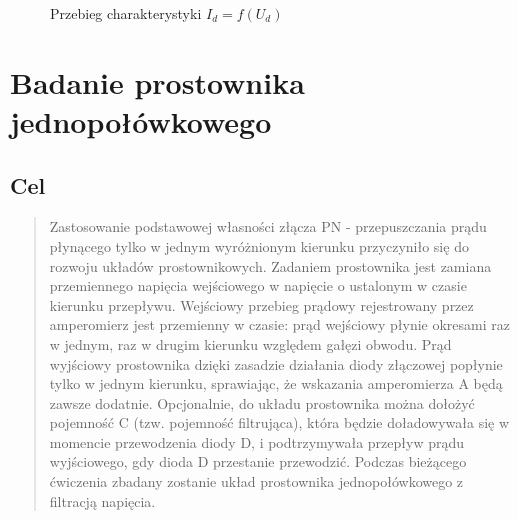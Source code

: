 \documentclass[polish,a4paper]{article}
\begin{document}
\begin{figure}[H]
\centering
{}
\caption{Przebieg charakterystyki $I_{d}=f(U_{d})$}
\end{figure}
\newpage

\section{Badanie prostownika jednopołówkowego}
\subsection{Cel}
\begin{quotation}
Zastosowanie podstawowej własności złącza PN - przepuszczania prądu płynącego tylko w jednym wyróżnionym kierunku przyczyniło się do rozwoju układów prostownikowych. Zadaniem prostownika jest zamiana przemiennego napięcia wejściowego w napięcie o ustalonym w czasie kierunku przepływu. Wejściowy przebieg prądowy rejestrowany przez amperomierz jest przemienny w czasie:  prąd wejściowy płynie okresami raz w jednym, raz w drugim kierunku względem gałęzi obwodu. Prąd wyjściowy prostownika dzięki zasadzie działania diody złączowej popłynie tylko w jednym kierunku, sprawiając, że wskazania amperomierza A będą  zawsze dodatnie. Opcjonalnie, do układu prostownika można dołożyć pojemność C (tzw. pojemność filtrująca), która będzie doładowywała się w momencie przewodzenia diody D, i podtrzymywała przepływ prądu wyjściowego, gdy dioda D przestanie przewodzić. Podczas bieżącego ćwiczenia zbadany zostanie układ prostownika jednopołówkowego z filtracją napięcia.\cite{naum}
\end{quotation}
\end{document}
